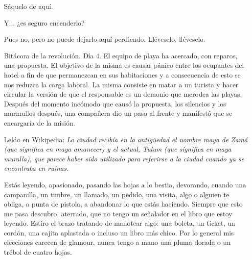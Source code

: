\documentclass[11pt,twoside,openright,a6paper]{book}
\begin{document}
Sáquelo de aquí.

Y... ¿es seguro encenderlo?

Pues no, pero no puede dejarlo aquí perdiendo. Lléveselo, lléveselo.


\vspace{0.5cm}
\hrulefill\hspace{0.2cm} \decofourleft\decofourright \hspace{0.2cm} \hrulefill
\vspace{0.5cm}

Bitácora de la revolución. Día 4. El equipo de playa ha acercado, con
reparos, una propuesta. El objetivo de la misma es causar pánico entre
los ocupantes del hotel a fin de que permanezcan en sus habitaciones y a
consecuencia de esto se nos reduzca la carga laboral. La misma consiste en
matar a un turista y hacer circular la versión de que el responsable es un
demonio que merodea las playas. Después del momento incómodo que causó
la propuesta, los silencios y los murmullos después, una compañera dio
un paso al frente y manifestó que se encargaría de la misión.



\vspace{0.5cm}
\hrulefill\hspace{0.2cm} \decofourleft\decofourright \hspace{0.2cm} \hrulefill
\vspace{0.5cm}

Leído en Wikipedia: \emph{La ciudad recibía en la
antigüedad el nombre maya de Zamá (que significa en maya amanecer) y
el actual, Tulum (que significa en maya muralla), que parece haber sido
utilizado para referirse a la ciudad cuando ya se encontraba en ruinas.}


\vspace{0.5cm}
\hrulefill\hspace{0.2cm} \decofourleft\decofourright \hspace{0.2cm} \hrulefill
\vspace{0.5cm}

Estás leyendo, apasionado, pasando las hojas a lo bestia, devorando, cuando
una campanilla, un timbre, un llamado, un pedido, una visita, algo o alguien
te obliga, a punta de pistola, a abandonar lo que estás haciendo. Siempre
que esto me pasa descubro, aterrado, que no tengo un señalador en el libro
que estoy leyendo. Estiro el brazo tratando de manotear algo: una boleta, un
ticket, un cordón, una cajita aplastada o incluso un libro más chico. Por
lo general mis elecciones carecen de glamour, nunca tengo a mano una pluma
dorada o un trébol de cuatro hojas.
\end{document}
